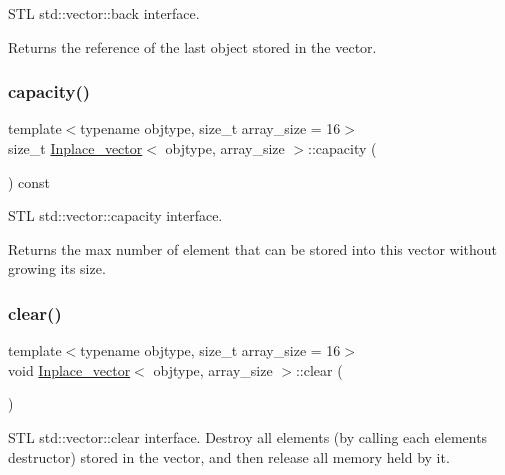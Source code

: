S\+TL std\+::vector\+::back interface. \begin{DoxyReturn}{Returns}
the reference of the last object stored in the vector. 
\end{DoxyReturn}
\mbox{\label{classInplace__vector_a7413b782c30385c34355aa8845c2d00f}} 
\subsubsection{\texorpdfstring{capacity()}{capacity()}}
{\footnotesize\ttfamily template$<$typename objtype, size\+\_\+t array\+\_\+size = 16$>$ \\
size\+\_\+t \mbox{\hyperlink{classInplace__vector}{Inplace\+\_\+vector}}$<$ objtype, array\+\_\+size $>$\+::capacity (\begin{DoxyParamCaption}{ }\end{DoxyParamCaption}) const\hspace{0.3cm}{\ttfamily [inline]}}

S\+TL std\+::vector\+::capacity interface. \begin{DoxyReturn}{Returns}
the max number of element that can be stored into this vector without growing its size. 
\end{DoxyReturn}
\mbox{\label{classInplace__vector_a64cc6a796c6d07205f2436c357bc1a0d}} 
\subsubsection{\texorpdfstring{clear()}{clear()}}
{\footnotesize\ttfamily template$<$typename objtype, size\+\_\+t array\+\_\+size = 16$>$ \\
void \mbox{\hyperlink{classInplace__vector}{Inplace\+\_\+vector}}$<$ objtype, array\+\_\+size $>$\+::clear (\begin{DoxyParamCaption}{ }\end{DoxyParamCaption})\hspace{0.3cm}{\ttfamily [inline]}}

S\+TL std\+::vector\+::clear interface. Destroy all elements (by calling each element\textquotesingle{}s destructor) stored in the vector, and then release all memory held by it. \mbox{\label{classInplace__vector_a27b8bdc0d5103bda8b03c5e9062be118}} 
